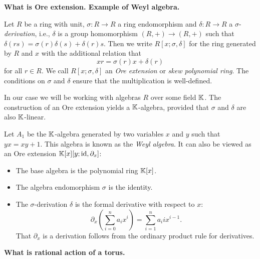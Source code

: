 \documentclass{article}
\DeclareMathOperator{\id}{id}
\begin{document}
\textbf{What is Ore extension. Example of Weyl algebra.}
\begin{definition}
	Let $R$ be a ring with unit, $\sigma \colon R \to R$ a ring endomorphism and
	$\delta \colon R \to R$ a $\sigma$-\emph{derivation}, i.e.,
	$\delta$ is a group homomorphism $(R, +) \to (R, +)$ such that $\delta (r s) =
		\sigma(r)\delta(s) + \delta(r) s$. Then we write $R[x;\sigma, \delta]$ for the ring generated by $R$ and $x$ with the additional relation that
	\begin{equation*}
		x r = \sigma(r) x + \delta(r)
	\end{equation*}
	for all $r \in R$. We call $R[x;\sigma, \delta]$ an \emph{Ore extension} or \emph{skew polynomial ring}. The conditions
	on $\sigma$ and $\delta$ ensure that the multiplication is well-defined.
\end{definition}
%
In our case we will be working with algebras $R$ over some field $\mathbb{K}$. The
construction of an Ore extension yields a $\mathbb{K}$-algebra, provided that $\sigma$ and
$\delta$ are also $\mathbb{K}$-linear.
\begin{example}
	Let $A_1$ be the $\mathbb{K}$-algebra generated by two variables $x$ and $y$ such that $yx =
		xy + 1$. This algebra is known as the \emph{Weyl algebra}. It can
	also be viewed as an Ore extension $\bbK[x][y; \id, \partial_x]$:
	\begin{itemize}
		\item The base algebra is the polynomial ring $\mathbb{K}[x]$.
		\item The algebra endomorphism $\sigma$ is the identity.
		\item The $\sigma$-derivation $\delta$ is the formal derivative with respect to $x$:
		      \begin{equation*}
			      \partial_x \left(\sum_{i=0}^n a_i x^i \right) = \sum_{i=1}^{n} a_i i x^{i-1}.
		      \end{equation*}
		      That $\partial_x$ is a derivation follows from the ordinary product rule for derivatives.
	\end{itemize}
\end{example}

\textbf{What is rational action of a torus.}
\end{document}
